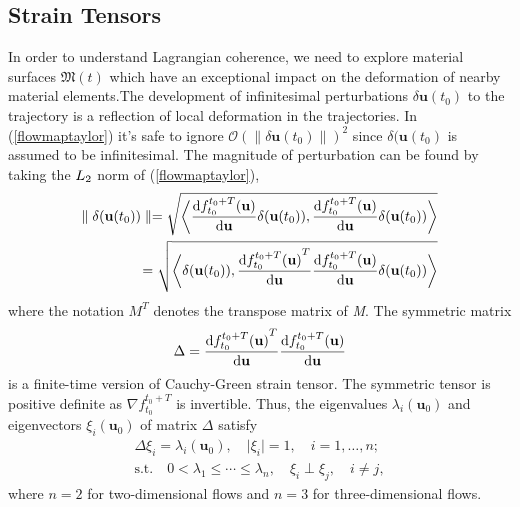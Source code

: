 \subsection{Strain Tensors}
In order to understand Lagrangian coherence, we need to explore material surfaces $ \mathfrak{M}(t) $ which have an exceptional impact on the deformation of nearby material elements.The development of infinitesimal perturbations $ \delta \textbf{u}(t_{0}) $ to the trajectory is a reflection of local deformation in the trajectories. In (\ref{flowmaptaylor}) it's safe to ignore $ \mathcal{O}(\parallel\delta\textbf{u}(t_{0})\parallel)^{2} $ since $\delta(\textbf{u}(t_{0})$ is assumed to be infinitesimal. The magnitude of perturbation can be found by taking the $ \normalfont L_{2} $ norm of (\ref{flowmaptaylor}),  
\begin{equation}
	\begin{split}
		\parallel\delta(\textbf{u}(t_{0}))\parallel = \sqrt{\bigg\langle\frac{\diff f_{t_{0}}^{t_{0}+T}(\textbf{u})}{\diff\textbf{u}}\delta(\textbf{u}(t_{0})), \frac{\diff f_{t_{0}}^{t_{0}+T}(\textbf{u})}{\diff\textbf{u}}\delta(\textbf{u}(t_{0})) \bigg \rangle} \\
		= \sqrt{\bigg\langle\delta(\textbf{u}(t_{0})), \frac{{\diff f_{t_{0}}^{t_{0}+T}(\textbf{u})}^{T}}{\diff\textbf{u}} \frac{\diff f_{t_{0}}^{t_{0}+T}(\textbf{u})}{\diff\textbf{u}}\delta(\textbf{u}(t_{0})) \bigg \rangle}
	\end{split}
\end{equation}
where the notation $ M^{T} $ denotes the transpose matrix of \textit{M}. The symmetric matrix
\begin{equation}
\Delta = \frac{{\mathop{}\!\mathrm{d} f_{t_{0}}^{t_{0}+T}(\textbf{u})}^{T}}{\mathop{}\!\mathrm{d}\textbf{u}} \frac{\mathop{}\!\mathrm{d} f_{t_{0}}^{t_{0}+T}(\textbf{u})}{\mathop{}\!\mathrm{d}\textbf{u}}
\end{equation}
is a finite-time version of Cauchy-Green strain tensor. The symmetric tensor is positive definite as $ \nabla f_{t_{0}}^{t_{0}+T} $ is invertible. Thus, the eigenvalues $ \lambda_{i}(\textbf{u}_{0}) $ and eigenvectors $ \xi_{i} (\textbf{u}_{0}) $ of matrix $ \Delta $ satisfy
\begin{equation}
	\begin{split}
		\Delta \xi_{i} = \lambda_{i}(\textbf{u}_{0}), \quad \vert\xi_{i}\vert = 1, \quad i = 1, \ldots , n; \\
		\text{s.t.} \quad 0 < \lambda_{1} \leq \cdots \leq \lambda_{n}, \quad \xi_{i} \perp \xi_{j},\quad i \neq j,
	\end{split}
\end{equation}
where $\textit{n} = 2$ for two-dimensional flows and $\textit{n} = 3$ for three-dimensional flows.

